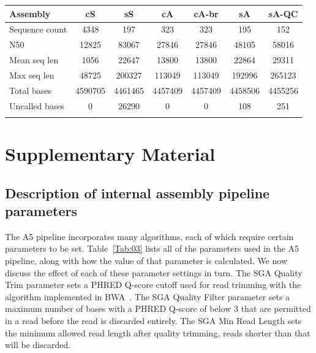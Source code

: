 \documentclass{bioinfo}
\begin{document}

\begin{table}[!t]
{\begin{tabular}{l|cccccc}\toprule
Assembly        & cS      & sS      & cA      & cA-br   & sA      & sA-QC   \\\midrule
Sequence count  & 4348    & 197     & 323     & 323     & 195     & 152     \\
N50             & 12825   & 83067   & 27846   & 27846   & 48105   & 58016   \\
Mean seq len    & 1056    & 22647   & 13800   & 13800   & 22864   & 29311   \\
Max seq len     & 48725   & 200327  & 113049  & 113049  & 192996  & 265123  \\
Total bases     & 4590705 & 4461465 & 4457409 & 4457409 & 4458506 & 4455256 \\
Uncalled bases  & 0       & 26290   & 0       & 0       & 108     & 251     \\
\botrule \\
\end{tabular}}{}
\end{table}

\section{Supplementary Material}
\subsection{Description of internal assembly pipeline parameters}

The A5 pipeline incorporates many algorithms, each of which require certain parameters to be set.
Table~\ref{Tab:03} lists all of the parameters used in the A5 pipeline, along with how the value
of that parameter is calculated. We now discuss the effect of each of these parameter settings in turn.  
The SGA Quality Trim parameter sets a PHRED Q-score cutoff used for read trimming with the algorithm
implemented in BWA~\citep{bwa}. The SGA Quality Filter parameter sets a maximum number of bases
with a PHRED Q-score of below 3 that are permitted in a read before the read is discarded entirely.
The SGA Min Read Length sets the minimum allowed read length after quality trimming, reads shorter
than that will be discarded.
\end{document}
